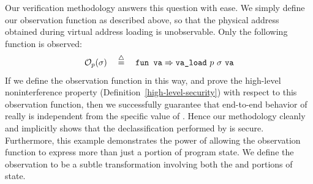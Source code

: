 Our verification methodology answers this question with ease. We
simply define our observation function as described above, so that
the physical address obtained during virtual address loading is 
unobservable. Only the following function is observed:
\[\mathcal{O}_{p}(\sigma) \quad \stackrel{\triangle}{=} \quad \text{\tt{fun}} \text{\tt{ va}} \Rightarrow
\text{\tt{va\_load}}~p~\sigma~\text{\tt{va}}\]
If we define the observation function in this way, and prove the 
high-level noninterference property (Definition~\ref{high-level-security})
with respect to this observation function, then we successfully 
guarantee that end-to-end behavior of  really is 
independent from the specific value of . Hence our methodology
cleanly and implicitly shows that the declassification performed 
by  is secure. Furthermore, this example demonstrates
the power of allowing the observation function to express more than
just a portion of program state. We define the observation to be
a subtle transformation involving both the
 and  portions of state.

